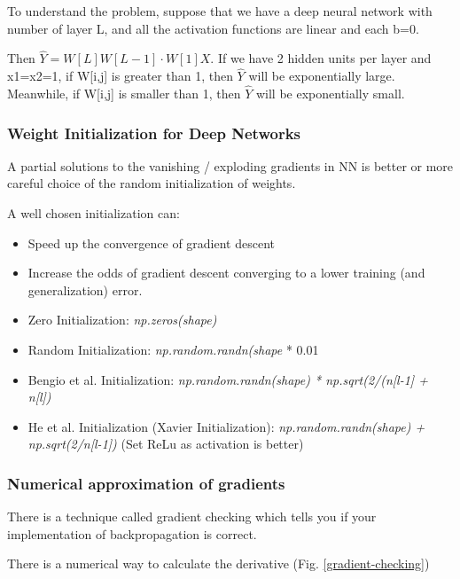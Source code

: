 To understand the problem, suppose that we have a deep neural network with number of layer L, and all the activation functions are linear and each b=0.

Then $\hat{Y} = W[L]W[L-1]\cdot W[1]X$. If we have 2 hidden units per layer and x1=x2=1, if W[i,j] is greater than 1, then $\hat{Y}$ will be exponentially large. Meanwhile, if W[i,j] is smaller than 1, then $\hat{Y}$ will be exponentially small.

\subsubsection{Weight Initialization for Deep Networks}
A partial solutions to the vanishing / exploding gradients in NN is better or more careful choice of the random initialization of weights.

A well chosen initialization can:

\begin{itemize}
    \item Speed up the convergence of gradient descent
    \item Increase the odds of gradient descent converging to a lower training (and generalization) error.
\end{itemize}

\begin{itemize}
    \item Zero Initialization: \textit{np.zeros(shape)}
    \item Random Initialization: \textit{np.random.randn(shape} * 0.01
    \item Bengio et al. Initialization: \textit{np.random.randn(shape) * np.sqrt(2/(n[l-1] + n[l])}
    \item He et al. Initialization (Xavier Initialization): \textit{np.random.randn(shape) + np.sqrt(2/n[l-1])} (Set ReLu as activation is better)
\end{itemize}

\subsubsection{Numerical approximation of gradients}
There is a technique called gradient checking which tells you if your implementation of backpropagation is correct.

There is a numerical way to calculate the derivative (Fig. \ref{gradient-checking})

